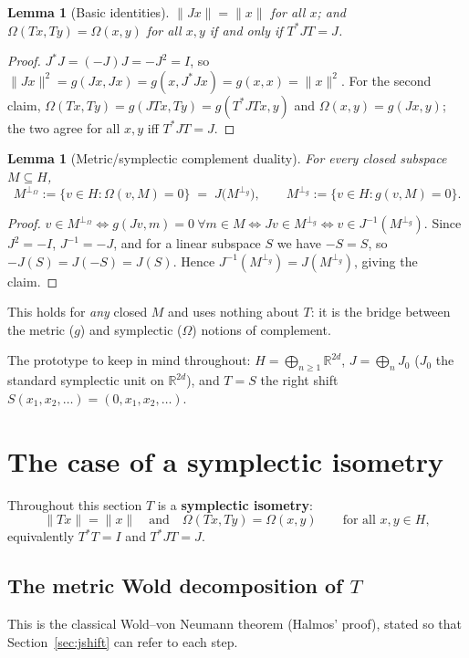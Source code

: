 \documentclass[11pt,a4paper]{article}
\newtheorem{lemma}[theorem]{Lemma}
\theoremstyle{definition}
\theoremstyle{remark}
\newcommand{\R}{\mathbb{R}}
\newcommand{\cJ}{J}
\newcommand{\Om}{\Omega}
\newcommand{\pO}{\perp_\Omega}
\newcommand{\pg}{\perp_g}
\begin{document}
\begin{lemma}[Basic identities]
\label{lem:basic}
$\|\cJ x\|=\|x\|$ for all $x$; and $\Om(Tx,Ty)=\Om(x,y)$ for all $x,y$ if and only if
$T^{*}\cJ T=\cJ$.
\end{lemma}
\begin{proof}
$\cJ^{*}\cJ=(-\cJ)\cJ=-\cJ^2=I$, so $\|\cJ x\|^2=g(\cJ x,\cJ x)=g(x,\cJ^*\cJ x)=g(x,x)=\|x\|^2$.
For the second claim, $\Om(Tx,Ty)=g(\cJ Tx,Ty)=g(T^*\cJ Tx,y)$ and $\Om(x,y)=g(\cJ x,y)$; the
two agree for all $x,y$ iff $T^*\cJ T=\cJ$.
\end{proof}

\begin{lemma}[Metric/symplectic complement duality]
\label{lem:duality}
For every closed subspace $M\subseteq H$,
\[
M^{\pO}:=\{v\in H:\Om(v,M)=0\}\;=\;\cJ\big(M^{\pg}\big),\qquad
M^{\pg}:=\{v\in H:g(v,M)=0\}.
\]
\end{lemma}
\begin{proof}
$v\in M^{\pO}\iff g(\cJ v,m)=0\ \forall m\in M\iff \cJ v\in M^{\pg}\iff v\in \cJ^{-1}(M^{\pg})$.
Since $\cJ^2=-I$, $\cJ^{-1}=-\cJ$, and for a linear subspace $S$ we have $-S=S$, so
$-\cJ(S)=\cJ(-S)=\cJ(S)$. Hence $\cJ^{-1}(M^{\pg})=\cJ(M^{\pg})$, giving the claim.
\end{proof}

This holds for \emph{any} closed $M$ and uses nothing about $T$: it is the bridge between the
metric ($g$) and symplectic ($\Om$) notions of complement.

The prototype to keep in mind throughout: $H=\bigoplus_{n\ge1}\R^{2d}$,
$\cJ=\bigoplus_nJ_0$ ($J_0$ the standard symplectic unit on $\R^{2d}$), and $T=S$ the right
shift $S(x_1,x_2,\dots)=(0,x_1,x_2,\dots)$.

\section{The case of a symplectic isometry}
\label{sec:isometric}

Throughout this section $T$ is a \textbf{symplectic isometry}:
\[
\|Tx\|=\|x\|\quad\text{and}\quad \Om(Tx,Ty)=\Om(x,y)\qquad\text{for all }x,y\in H,
\]
equivalently $T^{*}T=I$ and $T^{*}\cJ T=\cJ$.

\subsection{The metric Wold decomposition of $T$}

This is the classical Wold--von Neumann theorem (Halmos' proof), stated so that
Section~\ref{sec:jshift} can refer to each step.
\end{document}
